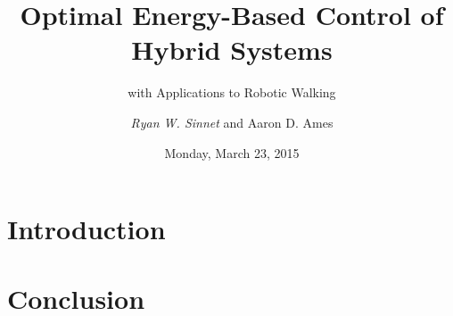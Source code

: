 \documentclass{beamer}
\title[Energy Shaping]{Optimal Energy-Based Control of Hybrid Systems}
\subtitle{with Applications to Robotic Walking}
\author{\emph{Ryan W. Sinnet} and Aaron D. Ames}
\institute{Department of Mechanical Engineering\\ Texas A\&M University}
\date{Monday, March 23, 2015}
\begin{document}
\frame{\titlepage}



\section{Introduction}
\showtoc




\section{Conclusion}
\showtoc
\end{document}
